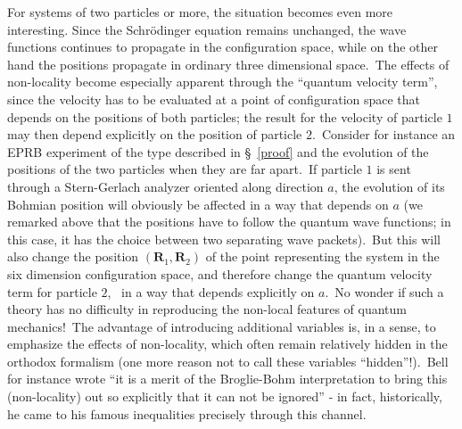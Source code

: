 \documentclass[12pt,onecolumn]{article}%
\begin{document}
For systems of two particles or more, the situation becomes even more
interesting. Since the Schr\"{o}dinger equation remains unchanged, the wave
functions continues to propagate in the configuration space, while on the
other hand the positions propagate in ordinary three dimensional space.\ The
effects of non-locality become especially apparent through the ``quantum
velocity term'', since the velocity has to be evaluated at a point of
configuration space that depends on the positions of both particles; the
result for the velocity of particle $1$ may then depend explicitly on the
position of particle $2$.\ Consider for instance an EPRB experiment of the
type described in \S \ \ref{proof} and the evolution of the positions of the
two particles when they are far apart.\ If particle $1$ is sent through a
Stern-Gerlach analyzer oriented along direction $a$, the evolution of its
Bohmian position will obviously be affected in a way that depends on $a$ (we
remarked above that the positions have to follow the quantum wave functions;
in this case, it has the choice between two separating wave packets).\ But
this will also change the position $(\mathbf{R}_{1},\mathbf{R}_{2})$ of the
point representing the system in the six dimension configuration space, and
therefore change the quantum velocity term for particle $2$, \ in a way that
depends explicitly on $a$.\ No wonder if such a theory has no difficulty in
reproducing the non-local features of quantum mechanics!\ The advantage of
introducing additional variables is, in a sense, to emphasize the effects of
non-locality, which often remain relatively hidden in the orthodox formalism
(one more reason not to call these variables ``hidden''!).\ Bell for instance
wrote ``it is a merit of the Broglie-Bohm interpretation to bring this
(non-locality) out so explicitly that it can not be ignored'' - in fact,
historically, he came to his famous inequalities precisely through this channel.
\end{document}

